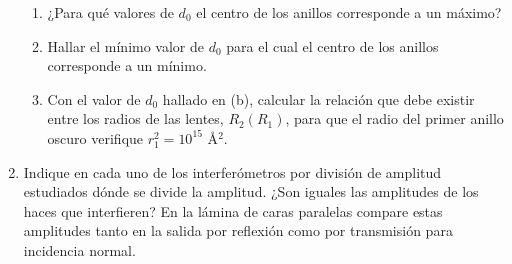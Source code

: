\documentclass[11pt,spanish]{article}
\begin{document}
\begin{enumerate}
    \begin{enumerate}
        \item ¿Para qué valores de $d_{0}$ el centro de los anillos corresponde
        a un máximo? 

        \item Hallar el mínimo valor de $d_{0}$ para el cual el centro de los anillos
        corresponde a un mínimo. 

        \item Con el valor de $d_{0}$ hallado en (b), calcular la relación que
        debe existir entre los radios de las lentes, $R_{2}(R_{1})$, para
        que el radio del primer anillo oscuro verifique $r_{1}^{2}=10^{15}$
        Å$^{2}$. 
    \end{enumerate}


    \item Indique en cada uno de los interferómetros por división de amplitud
    estudiados dónde se divide la amplitud. ¿Son iguales las amplitudes
    de los haces que interfieren? En la lámina de caras paralelas compare
    estas amplitudes tanto en la salida por reflexión como por transmisión
    para incidencia normal.

\end{enumerate}
\end{document}
